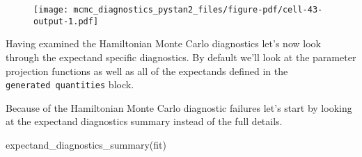 \documentclass[
  letterpaper,
  DIV=11,
  numbers=noendperiod]{scrartcl}
\newenvironment{Shaded}{\begin{snugshade}}{\end{snugshade}}
\newcommand{\NormalTok}[1]{\textcolor[rgb]{0.00,0.23,0.31}{#1}}
\begin{document}
\begin{figure}[H]

{\centering \texttt{[image: mcmc\_diagnostics\_pystan2\_files/figure-pdf/cell-43-output-1.pdf]}

}

\end{figure}

Having examined the Hamiltonian Monte Carlo diagnostics let's now look
through the expectand specific diagnostics. By default we'll look at the
parameter projection functions as well as all of the expectands defined
in the \texttt{generated\ quantities} block.

Because of the Hamiltonian Monte Carlo diagnostic failures let's start
by looking at the expectand diagnostics summary instead of the full
details.

\begin{Shaded}
\begin{Highlighting}[]
\NormalTok{expectand\_diagnostics\_summary(fit)}
\end{Highlighting}
\end{Shaded}
\end{document}
